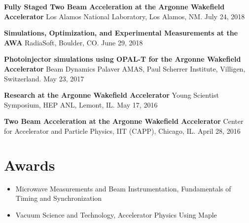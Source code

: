 \documentclass[11pt,a4paper,sans]{moderncv}        %
\begin{document}
\textbf{Fully Staged Two Beam Acceleration at the Argonne Wakefield Accelerator}\newline
Los Alamos National Laboratory, Los Alamos, NM. July 24, 2018
\vspace{0.3em}

\textbf{Simulations, Optimization, and Experimental Measurements at the AWA}\newline
RadiaSoft, Boulder, CO. June 29, 2018
\vspace{0.3em}

\textbf{Photoinjector simulations using OPAL-T for the Argonne Wakefield Accelerator}\newline
Beam Dynamics Palaver AMAS, Paul Scherrer Institute, Villigen, Switzerland. May 23, 2017
\vspace{0.3em}

\textbf{Research at the Argonne Wakefield Accelerator}\newline
Young Scientist Symposium, HEP ANL, Lemont, IL. May 17, 2016
\vspace{0.3em}

\textbf{Two Beam Acceleration at the Argonne Wakefield Accelerator}\newline
Center for Accelerator and Particle Physics, IIT (CAPP), Chicago, IL. April 28, 2016


\section{Awards}


\begin{itemize}
	\item {Microwave Measurements and Beam Instrumentation, Fundamentals of Timing and Synchronization}
	\item {Vacuum Science and Technology, Accelerator Physics Using Maple}
\end{itemize}
\end{document}
